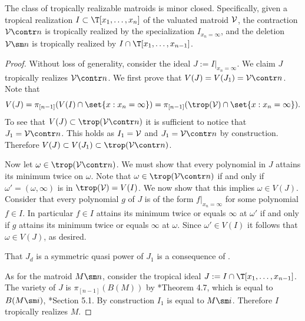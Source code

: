 \begin{theorem}\label{thm:minorClosed}
The class of tropically realizable matroids is minor closed. Specifically, given a tropical realization $I\subset \T[x_1,\dots,x_n]$ of the valuated matroid $\mathcal{V}$, the contraction $\sV\contr n$ is tropically realized by the specialization $I_{x_n=\infty}$, and the deletion $\sV\sm n$ is tropically realized by $I\cap\T[x_1,\dots,x_{n-1}]$.
\end{theorem}
\begin{proof}
Without loss of generality, consider the ideal $J:= I|_{x_n=\infty}$. We claim $J$ tropically realizes $\sV\contr n$. We first prove that $V(J) = V(J_1)=\sV\contr n$. Note that
$$V(J)= \pi_{[n-1]}(V(I)\cap \set{x: x_n = \infty}) = \pi_{[n-1]}(\trop(\sV)\cap\set{x: x_n=\infty}).$$
To see that $V(J)\subset \trop(\sV\contr n)$ it is sufficient to notice that $J_1 = \sV\contr n$. This holds as $I_1=\mathcal{V}$ and $J_1=\sV\contr n$ by construction. Therefore $V(J)\subset V(J_1)\subset \trop(\sV\contr n)$. 

Now let $\omega\in \trop(\sV\contr n)$. We must show that every polynomial in $J$ attains its minimum twice on $\omega$. Note that $\omega\in \trop(\sV\contr n)$ if and only if $\omega'=(\omega,\infty)$ is in $\trop(\sV)=V(I)$. We now show that this implies $\omega\in V(J)$. Consider that every polynomial $g$ of $J$ is of the form $f|_{x_n=\infty}$ for some polynomial $f\in I$. In particular $f\in I$ attains its minimum twice or equals $\infty$ at $\omega'$ if and only if $g$ attains its minimum twice or equals $\infty$ at $\omega$. Since $\omega'\in V(I)$ it follows that $\omega\in V(J)$, as desired. 

That $J_d$ is a symmetric quasi power of $J_1$ is a consequence of .

As for the matroid $M\sm n$, consider the tropical ideal $J := I\cap \T[x_1,\dots,x_{n-1}]$. The variety of $J$ is $\pi_{[n-1]}(B(M))$ by \cite{MR20}*{Theorem 4.7}, which is equal to $B(M\sm i)$, \cite{dMRS20}*{Section 5.1}. By construction $I_1$ is equal to $M\sm i$. Therefore $I$ tropically realizes $M$. 
\end{proof}


